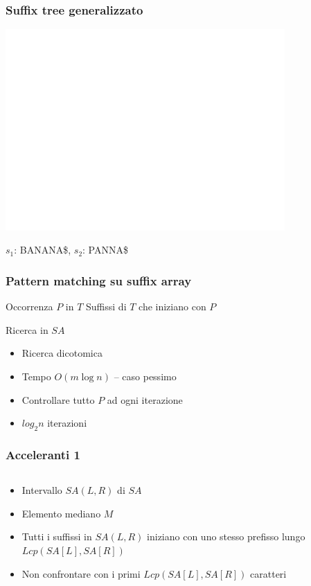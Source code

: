 \begin{frame}
\frametitle{Suffix tree generalizzato}
\begin{center}
\includegraphics[width=0.8\textwidth]{figures/ST-banana-panna}
\end{center}
$s_{1}$: BANANA\$, $s_{2}$: PANNA\$
\end{frame}


\begin{frame}[fragile]
\frametitle{Pattern matching su suffix array}
\begin{block}{Occorrenza $P$ in $T$}
Suffissi di $T$ che iniziano con $P$
\end{block}
\begin{block}{Ricerca in $SA$}
\begin{itemize}
\item
Ricerca dicotomica
\item
Tempo $O(m \log n)$ -- caso pessimo
\item
Controllare tutto $P$ ad ogni iterazione
\item
$log_{2} n$ iterazioni
\end{itemize}
\end{block}
\end{frame}

\begin{frame}[fragile]
\frametitle{Acceleranti 1}
\begin{columns}
\begin{column}{0.5\textwidth}
\begin{itemize}
\item
Intervallo $SA(L, R)$ di $SA$
\item
Elemento mediano $M$
\item
Tutti i suffissi in $SA(L,R)$ iniziano con uno stesso prefisso lungo $Lcp(SA[L],
SA[R])$
\item
Non confrontare con i primi $Lcp(SA[L], SA[R])$ caratteri
\end{itemize}
\end{column}
\begin{column}{0.4\textwidth}
\begin{center}
\end{center}
\end{column}
\end{columns}
\end{frame}

